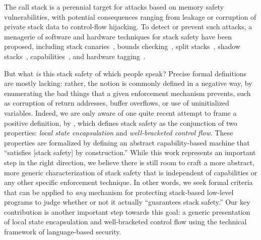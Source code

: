 \documentclass[acmsmall,review,anonymous]{acmart}\settopmatter{printfolios=true,printccs=false,printacmref=false}
\begin{document}

The call stack is a perennial target for attacks
based on memory safety vulnerabilities, with potential consequences
ranging from leakage or corruption of private stack data to
control-flow hijacking. To detect or prevent such attacks, a menagerie of
software and hardware techniques for stack safety have been proposed,
%
including stack canaries~\citep{Cowan+98},
bounds checking~\citep{NagarakatteZMZ09,NagarakatteZMZ10,DeviettiBMZ08},
split stacks~\citep{Kuznetsov+14},
shadow stacks~\citep{Dang+15,Shanbhogue+19},
capabilities~\citep{Woodruff+14,Chisnall+15,Skorstengaard+19,Skorstengaard+19b},
and hardware tagging~\citep{DBLP:conf/sp/RoesslerD18}. \ifaftersubmission{}
\fi

But what {\em is} this stack safety of which people speak? Precise formal
definitions are mostly lacking: rather, the notion
is commonly defined in a negative way, by enumerating the bad things that a
given enforcement mechanism
prevents, such as corruption of return addresses, buffer overflows, or
use of uninitialized variables.
Indeed, we are only aware of one quite recent attempt to frame a
positive definition, by
\citet{Skorstengaard+19}, which defines stack safety as
the conjunction of two properties: {\em local state encapsulation} and {\em
  well-bracketed control flow}.
These properties are formalized by defining an abstract capability-based machine
that ``satisfies [stack safety] by construction.''
%
While this work represents an important step in the right direction, we believe
there is still room to craft a more abstract, more generic characterization
of stack safety that is independent of capabilities or any other specific
enforcement
technique.  In other words, we seek formal criteria that can be applied
to \emph{any} mechanism for protecting stack-based low-level programs to judge
whether or not it actually ``guarantees stack safety.''
%
Our key contribution is another important step towards this goal: a generic
presentation of local state encapsulation and well-bracketed
control flow using the technical
framework of language-based security.
\end{document}
